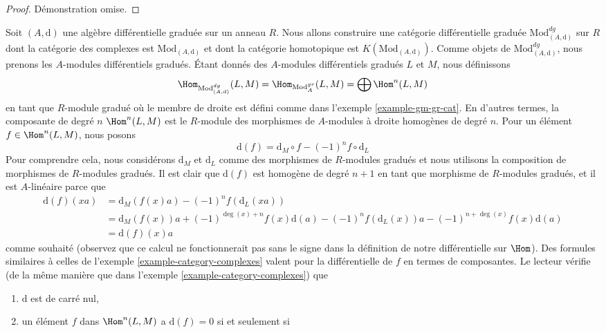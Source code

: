 \begin{proof}
Démonstration omise.
\end{proof}

\begin{example}
\label{example-dgm-dg-cat}
Soit $(A, \text{d})$ une algèbre différentielle graduée sur un anneau $R$. Nous allons
construire une catégorie différentielle graduée $\text{Mod}^{dg}_{(A, \text{d})}$ sur
$R$ dont la catégorie des complexes est $\text{Mod}_{(A, \text{d})}$ et dont la
catégorie homotopique est $K(\text{Mod}_{(A, \text{d})})$. Comme objets de
$\text{Mod}^{dg}_{(A, \text{d})}$, nous prenons les
$A$-modules différentiels gradués. Étant donnés des $A$-modules
différentiels gradués $L$ et $M$, nous définissons
$$
\Hom_{\text{Mod}^{dg}_{(A, \text{d})}}(L, M) =
\Hom_{\text{Mod}^{gr}_A}(L, M) = \bigoplus \Hom^n(L, M)
$$
en tant que $R$-module gradué où le membre de droite est défini comme dans
l'exemple \ref{example-gm-gr-cat}. En d'autres termes, la composante de degré $n$
$\Hom^n(L, M)$ est le $R$-module des morphismes de $A$-modules à droite homogènes
de degré $n$. Pour un élément $f \in \Hom^n(L, M)$, nous posons
$$
\text{d}(f) = \text{d}_M \circ f - (-1)^n f \circ \text{d}_L
$$
Pour comprendre cela, nous considérons $\text{d}_M$ et $\text{d}_L$ comme des
morphismes de $R$-modules gradués et nous utilisons la composition de
morphismes de $R$-modules gradués. Il est clair que $\text{d}(f)$ est homogène de degré
$n + 1$ en tant que morphisme de $R$-modules gradués, et il est $A$-linéaire
parce que
\begin{align*}
\text{d}(f)(xa)
& =
\text{d}_M(f(x) a) - (-1)^n f (\text{d}_L(xa)) \\
& =
\text{d}_M(f(x)) a + (-1)^{\deg(x) + n} f(x) \text{d}(a) -
(-1)^n f(\text{d}_L(x)) a - (-1)^{n + \deg(x)} f(x) \text{d}(a) \\ & =
\text{d}(f)(x) a
\end{align*}
comme souhaité (observez que ce calcul ne fonctionnerait pas sans le signe
dans la définition de notre différentielle sur $\Hom$). Des formules similaires
à celles de l'exemple \ref{example-category-complexes} valent pour la
différentielle de $f$ en termes de composantes. Le
lecteur vérifie (de la même manière que dans
l'exemple \ref{example-category-complexes}) que
\begin{enumerate}
\item $\text{d}$ est de carré nul,
\item un élément $f$ dans $\Hom^n(L, M)$ a $\text{d}(f) = 0$ si et seulement si

\end{enumerate}
\end{example}
